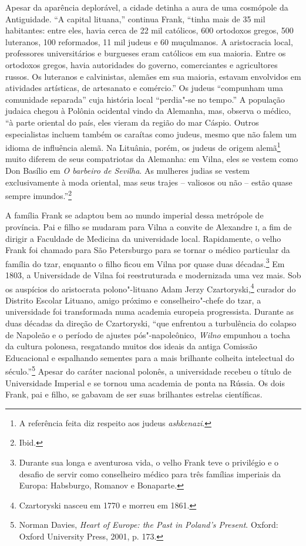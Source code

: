 Apesar da aparência deplorável, a cidade detinha a aura de uma cosmópole
da Antiguidade. ``A capital lituana,'' continua Frank, ``tinha mais de
35 mil habitantes: entre eles, havia cerca de 22 mil católicos, 600
ortodoxos gregos, 500 luteranos, 100 reformados, 11 mil judeus e 60
muçulmanos. A aristocracia local, professores universitários e burgueses
eram católicos em sua maioria. Entre os ortodoxos gregos, havia
autoridades do governo, comerciantes e agricultores russos. Os luteranos
e calvinistas, alemães em sua maioria, estavam envolvidos em atividades
artísticas, de artesanato e comércio.'' Os judeus ``compunham uma
comunidade separada'' cuja história local ``perdia"-se no tempo.'' A
população judaica chegou à Polônia ocidental vindo da Alemanha, mas,
observa o médico, ``à parte oriental do país, eles vieram
da região do mar Cáspio. Outros especialistas incluem também os caraítas
como judeus, mesmo que não falem um idioma de influência alemã. Na
Lituânia, porém, os judeus de origem alemã\footnote{A referência feita diz respeito aos judeus \textit{ashkenazi}.} muito diferem
de seus compatriotas da Alemanha: em Vilna, eles se vestem como Don
Basílio em \textit{O barbeiro de Sevilha}. As mulheres judias se vestem
exclusivamente à moda oriental, mas seus trajes -- valiosos ou não --
estão quase sempre imundos.''\footnote{Ibid.}

A família Frank se adaptou bem ao mundo imperial dessa metrópole de
província. Pai e filho se mudaram para Vilna a convite de Alexandre \textsc{i}, a
fim de dirigir a Faculdade de Medicina da universidade local.
Rapidamente, o velho Frank foi chamado para São Petersburgo para se
tornar o médico particular da família do tzar, enquanto o filho ficou em
Vilna por quase duas décadas.\footnote{Durante sua longa e aventurosa vida, o
velho Frank teve o privilégio e o desafio de servir como conselheiro
médico para três famílias imperiais da Europa: Habsburgo, Romanov e
Bonaparte.} Em 1803, a Universidade de Vilna foi reestruturada e
modernizada uma vez mais. Sob os auspícios do aristocrata polono"-lituano
Adam Jerzy Czartoryski,\footnote{Czartoryski nasceu em 1770 e morreu em 1861.} curador do Distrito Escolar Lituano,
amigo próximo e conselheiro"-chefe do tzar, a universidade foi
transformada numa academia europeia progressista. Durante as duas
décadas da direção de Czartoryski, ``que enfrentou a turbulência do
colapso de Napoleão e o período de ajustes pós"-napoleônico, \textit{Wilno}
empunhou a tocha da cultura polonesa, resgatando muitos dos ideais da
antiga Comissão Educacional e espalhando sementes para a mais brilhante
colheita intelectual do século.''\footnote{Norman Davies, \textit{Heart of Europe: the Past in Poland's Present}. Oxford: Oxford University Press, 2001, p. 173.} Apesar do caráter nacional polonês, a universidade recebeu o título de Universidade Imperial e se tornou uma
academia de ponta na Rússia. Os dois Frank, pai e filho, se gabavam de
ser suas brilhantes estrelas científicas.

